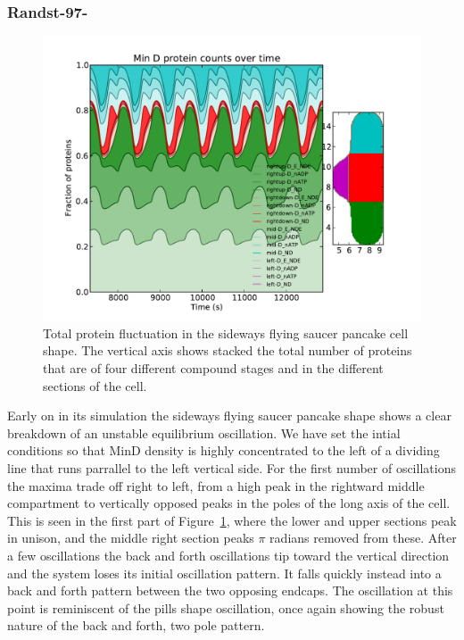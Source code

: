 \documentclass[letterpaper,twocolumn,amsmath,amssymb,pre]{revtex4-1}
\begin{document}


\subsubsection{Randst-97-}
\begin{figure}
  \includegraphics[width=\columnwidth]{../data/shape-randst/plots/box-plot_D--randst-25-800-600-9700-1500}
  \caption{Total protein fluctuation in the sideways flying saucer
    pancake cell shape.  The vertical axis shows stacked the total
    number of proteins that are of four different compound stages and
    in the different sections of the cell.}
  \label{box-97}
\end{figure}

Early on in its simulation the sideways flying saucer pancake shape
shows a clear breakdown of an unstable equilibrium oscillation.  We
have set the intial conditions so that MinD density is highly
concentrated to the left of a dividing line that runs parrallel to the
left vertical side.  For the first number of oscillations the maxima
trade off right to left, from a high peak in the rightward middle
compartment to vertically opposed peaks in the poles of the long axis
of the cell.  This is seen in the first part of Figure~\ref{box-97},
where the lower and upper sections peak in unison, and the middle
right section peaks $\pi$ radians removed from these.  After a few
oscillations the back and forth oscillations tip toward the vertical
direction and the system loses its initial oscillation pattern.  It
falls quickly instead into a back and forth pattern between the two
opposing endcaps.  The oscillation at this point is reminiscent of the
pills shape oscillation, once again showing the robust nature of the
back and forth, two pole pattern.
\end{document}
